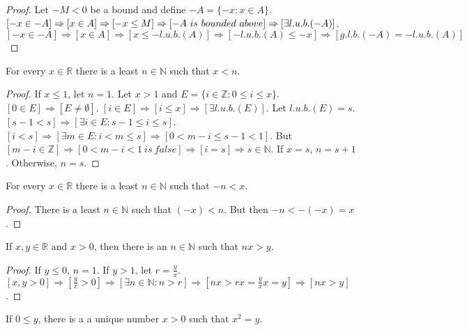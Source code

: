 \documentclass[crop=false,class=article,oneside]{standalone}
\begin{document}
    \begin{proof}
    Let $-M<0$ be a bound and define $-A = \{-x: x\in A\}$. $[-x\in -A]\Rightarrow [x\in A]\Rightarrow [-x\leq M]\Rightarrow [-A\ is\ bounded\ above]\\ \Rightarrow [\exists l.u.b.(-A)]$. $[-x\in -A]\Rightarrow [x\in A]\Rightarrow [x\leq -l.u.b.(A)]\Rightarrow [-l.u.b.(A)\leq -x]\Rightarrow [g.l.b.(-A)=-l.u.b.(A)]$
    \end{proof}
    \begin{theorem}
    For every $x\in \mathbb{R}$ there is a least $n\in \mathbb{N}$ such that $x<n$. 
    \end{theorem}
    \begin{proof}
    If $x\leq1$, let $n=1$. Let $x>1$ and $E=\{i \in \mathbb{Z}: 0 \leq i \leq x\}$. $[0\in E]\Rightarrow [E\ne \emptyset]$. $[i\in E]\Rightarrow [i\leq x]\Rightarrow [\exists l.u.b.(E)]$. Let $l.u.b.(E)=s$. $[s-1<s]\Rightarrow [\exists i \in E:s-1 \leq i \leq s]$. $[i< s]\Rightarrow[\exists m\in E: i < m \leq s]\Rightarrow [0 < m-i \leq s-1 < 1]$. But $[m-i \in \mathbb{Z}]\Rightarrow [0<m-i<1\ is\ false]\Rightarrow [i = s]\Rightarrow s\in \mathbb{N}$. If $x=s$, $n = s+1$. Otherwise, $n=s$.
    \end{proof}
    \begin{corollary}
    For every $x\in \mathbb{R}$ there is a least $n\in \mathbb{N}$ such that $-n<x$.
    \end{corollary}
    \begin{proof}
    There is a least $n\in \mathbb{N}$ such that $(-x)<n$. But then $-n <-(-x) = x$. 
    \end{proof}
    \begin{corollary}
    If $x,y\in \mathbb{R}$ and $x>0$, then there is an $n\in \mathbb{N}$ such that $nx>y$.
    \end{corollary}
    \begin{proof}
    If $y\leq 0$, $n=1$. If $y>1$, let $r = \frac{y}{x}$. $[x,y>0]\Rightarrow [\frac{y}{x}>0]\Rightarrow [\exists n\in \mathbb{N}:n>r]\Rightarrow [nx > rx = \frac{y}{x}x = y]\Rightarrow[nx>y]$.
    \end{proof}
    \begin{theorem}
    If $0\leq y$, there is a a unique number $x>0$ such that $x^2 = y$.
    \end{theorem}
\end{document}
